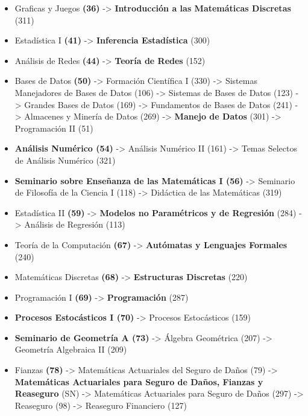 \begin{appendices}
\begin{enumerate}
\begin{itemize}
  \item Graficas y Juegos \textbf{(36)} -> \textbf{Introducción a las Matemáticas Discretas} (311)
  
  \item Estadística I \textbf{(41)} -> \textbf{Inferencia Estadística} (300)
  
  \item Análisis de Redes \textbf{(44)} -> \textbf{Teoría de Redes} (152)
  
  \item Bases de Datos \textbf{(50)} -> Formación Científica I (330) -> Sistemas Manejadores de Bases de Datos (106) -> Sistemas de Bases de Datos (123) -> Grandes Bases de Datos (169) -> Fundamentos de Bases de Datos (241) -> Almacenes y Minería de Datos (269) -> \textbf{Manejo de Datos} (301) -> Programación II (51)
  
  \item \textbf{Análisis Numérico (54)} -> Análisis Numérico II (161) -> Temas Selectos de Análisis Numérico (321)
  
  \item \textbf{Seminario sobre Enseñanza de las Matemáticas I (56)} -> Seminario de Filosofía de la Ciencia I (118) -> Didáctica de las Matemáticas (319)
  
  \item Estadística II \textbf{(59)} -> \textbf{Modelos no Paramétricos y de Regresión} (284) -> Análisis de Regresión (113)
  
  \item Teoría de la Computación \textbf{(67)} -> \textbf{Autómatas y Lenguajes Formales} (240)
  
  \item Matemáticas Discretas \textbf{(68)} -> \textbf{Estructuras Discretas} (220)
  
  \item Programación I \textbf{(69)} -> \textbf{Programación} (287)
  
  \item \textbf{Procesos Estocásticos I (70)} -> Procesos Estocásticos (159)

  \item \textbf{Seminario de Geometría A (73)} -> Álgebra Geométrica (207) -> Geometría Algebraica II (209)
  
  \item Fianzas \textbf{(78)} -> Matemáticas Actuariales del Seguro de Daños (79) -> \textbf{Matemáticas Actuariales para Seguro de Daños, Fianzas y Reaseguro} (SN) -> Matemáticas Actuariales para Seguro de Daños (297) -> Reaseguro (98) -> Reaseguro Financiero (127)
  

\end{itemize}
\end{enumerate}
\end{appendices}
